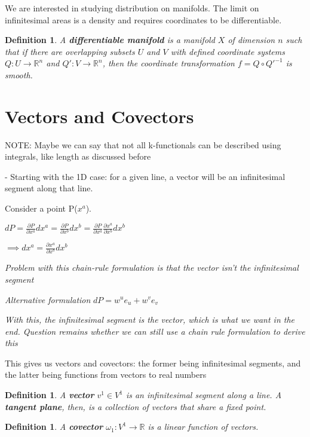 \documentclass{book}
\newtheorem{defn}[equation]{Definition}
\begin{document}
We are interested in studying distribution on manifolds. The limit on infinitesimal areas is a density and requires coordinates to be differentiable.


\begin{defn}
	A \textbf{differentiable manifold} is a manifold $X$ of dimension $n$ such that if there are overlapping subsets $U$ and $V$ with defined coordinate systems $Q: U \to \mathbb{R}^n$ and $Q': V \to \mathbb{R}^n$, then the coordinate transformation $f = Q \circ Q'^{-1}$ is smooth. 
\end{defn}





\section{Vectors and Covectors}
NOTE: Maybe we can say that not all k-functionals can be described using integrals, like length as discussed before


- Starting with the 1D case: for a given line, a vector will be an infinitesimal segment along that line. 


Consider a point P($x^a$).
 
$dP = \frac{\partial P}{\partial x^a} dx^a = \frac{\partial P}{\partial x^b} dx^b = \frac{\partial P}{\partial x^a}\frac{\partial x^a}{\partial x^b} dx^b$

$\implies dx^a = \frac{\partial x^a}{\partial x^b}dx^b $

\emph{Problem with this chain-rule formulation is that the vector isn't the infinitesimal segment}

\emph{Alternative formulation}
$dP = w^ue_u + w^ve_v$

\emph{With this, the infinitesimal segment is the vector, which is what we want in the end. Question remains whether we can still use a chain rule formulation to derive this}

This gives us vectors and covectors: the former being infinitesimal segments, and the latter being functions from vectors to real numbers



\begin{defn}
	A \textbf{vector} $v^1 \in V^1$ is an infinitesimal segment along a line. A \textbf{tangent plane}, then, is a collection of vectors that share a fixed point. 
\end{defn}


\begin{defn}
	A \textbf{covector} $\omega_1 : V^1 \to \mathbb{R}$ is a linear function of vectors. 
\end{defn}
\end{document}
